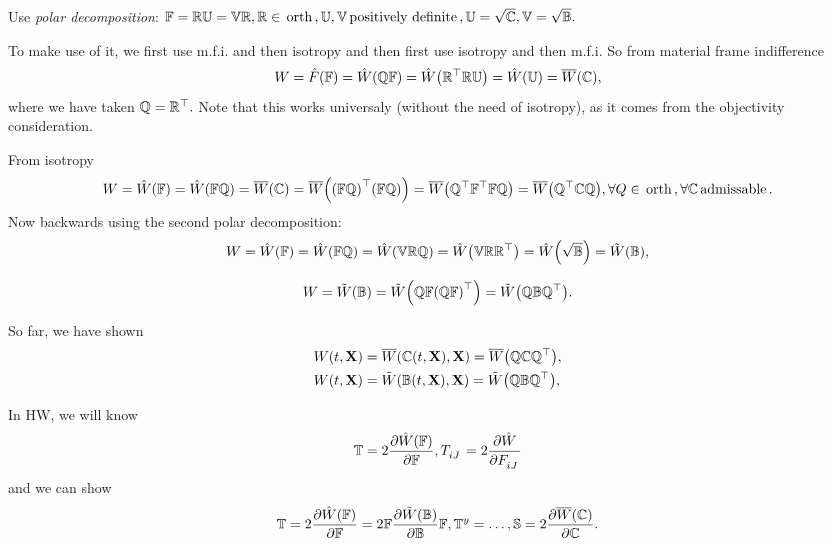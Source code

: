 \documentclass[11pt]{scrartcl} %
\begin{document}
Use \textit{polar decomposition}: $\mathbb{F} = \mathbb{R}\mathbb{U} = \mathbb{V}\mathbb{R}, \mathbb{R} \in \, \text{orth} \,, \mathbb{U,V} \, \text{positively definite} \,, \mathbb{U} = \sqrt{\mathbb{C}}, \mathbb{V} = \sqrt{\mathbb{B}}.$ 

To make use of it, we first use m.f.i. and then isotropy and then first use isotropy and then m.f.i.
So from material frame indifference
\[
	W = \hat{F}\qty(\mathbb{F}) = \hat{W}\qty(\mathbb{Q}\mathbb{F}) = \hat{W}\qty(\mathbb{R}^\top \mathbb{R} \mathbb{U}) = \hat{W}\qty(\mathbb{U}) = \overline{W}\qty(\mathbb{C}),
\]
where we have taken $\mathbb{Q} = \mathbb{R}^\top.$ Note that this works universaly (without the need of isotropy), as it comes from the objectivity consideration.

From isotropy
\[
	W = \hat{W}\qty(\mathbb{F}) = \hat{W}\qty(\mathbb{F} \mathbb{Q}) = \overline{W}\qty(\mathbb{C}) = \overline{W}\qty(\qty(\mathbb{F} \mathbb{Q})^\top \qty(\mathbb{F} \mathbb{Q})) = \overline{W}\qty(\mathbb{Q}^\top \mathbb{F}^\top\mathbb{F} \mathbb{Q}) = \overline{W}\qty(\mathbb{Q}^\top\mathbb{C} \mathbb{Q}), \forall Q \in \, \text{orth} \,, \forall \mathbb{C} \, \text{admissable} \,.
\]
Now backwards using the second polar decomposition:
\[
	W = \hat{W}\qty(\mathbb{F}) = \hat{W}\qty(\mathbb{F} \mathbb{Q}) = \hat{W}\qty(\mathbb{V}\mathbb{R}\mathbb{Q}) = \hat{W}\qty(\mathbb{V}\mathbb{R}\mathbb{R}^\top) = \hat{W}\qty(\sqrt{\mathbb{B}}) = \tilde{W}\qty(\mathbb{B}),
\]

\[
	W = \tilde{W}\qty(\mathbb{B}) = \tilde{W}\qty(\mathbb{Q}\mathbb{F} \qty(\mathbb{Q}\mathbb{F})^\top) = \tilde{W}\qty(\mathbb{Q}\mathbb{B} \mathbb{Q}^\top).
\]

So far, we have shown
\begin{align*}
	W\qty(t,\vb{X}) &= \overline{W}\qty(\mathbb{C}\qty(t,\vb{X}),\vb{X}) = \overline{W}\qty(\mathbb{Q}\mathbb{C} \mathbb{Q}^\top), \\ W\qty(t,\vb{X}) &= \tilde{W}\qty(\mathbb{B}(t,\vb{X}), \vb{X}) = \tilde{W}\qty(\mathbb{Q} \mathbb{B} \mathbb{Q}^\top),
\end{align*}

In HW, we will know
\[
	\pkstress = 2 \pdv{\hat{W}\qty(\fgrad)}{\fgrad}, T \indices{_{iJ}} = 2 \pdv{\hat{W}}{F \indices{_{iJ}}}
\]
and we can show
\[
	\mathbb{T} = 2\pdv{\hat{W}\qty(\ensuremath{\mathbb{F}})}{\ensuremath{\mathbb{F}}} = 2 \mathbb{F} \pdv{\tilde{W}\qty(\ensuremath{\mathbb{B}})}{\ensuremath{\mathbb{B}}}\mathbb{F}, \mathbb{T}^y  = \dots, \mathbb{S} = 2 \pdv{\overline{W}\qty(\ensuremath{\mathbb{C}})}{\ensuremath{\mathbb{C}}}.
\]
\end{document}
